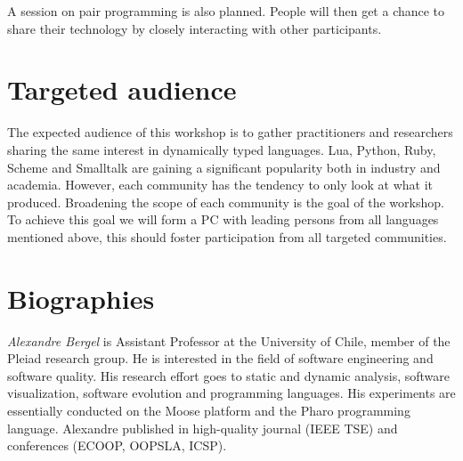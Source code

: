 \documentclass[runningheads]{llncs}
\newcommand\AK[1]{\nb{akuhn}{#1}}
\begin{document}
A session on pair programming is also planned. People will then get a chance to share their technology by closely interacting with other participants. 


\section{Targeted audience}

The expected audience of this workshop is to gather practitioners and researchers sharing the same interest in dynamically typed languages. Lua, Python, Ruby, Scheme and Smalltalk are gaining a significant popularity both in industry and academia. However, each community has the tendency to only look at what it produced. Broadening the scope of each community is the goal of the workshop. To achieve this goal we will form a PC with leading persons from all languages mentioned above, this should foster participation from all targeted communities.


\section{Biographies}

\noindent \emph{Alexandre Bergel} is Assistant Professor at the University of Chile, member of the Pleiad research group. He is interested in the field of software engineering and software quality. His research effort goes to static and dynamic analysis, software visualization, software evolution and programming languages. His experiments are essentially conducted on the Moose platform and the Pharo programming language. Alexandre published in high-quality journal (IEEE TSE) and conferences (ECOOP, OOPSLA, ICSP).\\

\end{document}
